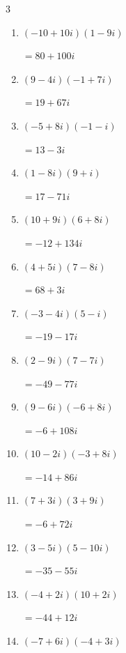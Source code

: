 \begin{multicols}{3}
\begin{enumerate}
        $\displaystyle =-88-28i$

  \item $\displaystyle (-10+10i)(1-9i)$

        $\displaystyle =80+100i$

  \item $\displaystyle (9-4i)(-1+7i)$

        $\displaystyle =19+67i$

  \item $\displaystyle (-5+8i)(-1-i)$

        $\displaystyle =13-3i$

  \item $\displaystyle (1-8i)(9+i)$

        $\displaystyle =17-71i$

  \item $\displaystyle (10+9i)(6+8i)$

        $\displaystyle =-12+134i$

  \item $\displaystyle (4+5i)(7-8i)$

        $\displaystyle =68+3i$

  \item $\displaystyle (-3-4i)(5-i)$

        $\displaystyle =-19-17i$

  \item $\displaystyle (2-9i)(7-7i)$

        $\displaystyle =-49-77i$

  \item $\displaystyle (9-6i)(-6+8i)$

        $\displaystyle =-6+108i$

  \item $\displaystyle (10-2i)(-3+8i)$

        $\displaystyle =-14+86i$

  \item $\displaystyle (7+3i)(3+9i)$

        $\displaystyle =-6+72i$

  \item $\displaystyle (3-5i)(5-10i)$

        $\displaystyle =-35-55i$

  \item $\displaystyle (-4+2i)(10+2i)$

        $\displaystyle =-44+12i$

  \item $\displaystyle (-7+6i)(-4+3i)$


\end{enumerate}
\end{multicols}
